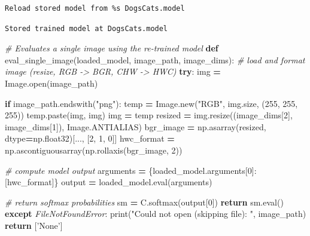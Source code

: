 \documentclass[]{book}
\newenvironment{Shaded}{\begin{snugshade}}{\end{snugshade}}
\newcommand{\KeywordTok}[1]{\textcolor[rgb]{0.13,0.29,0.53}{\textbf{#1}}}
\newcommand{\DecValTok}[1]{\textcolor[rgb]{0.00,0.00,0.81}{#1}}
\newcommand{\SpecialCharTok}[1]{\textcolor[rgb]{0.00,0.00,0.00}{#1}}
\newcommand{\StringTok}[1]{\textcolor[rgb]{0.31,0.60,0.02}{#1}}
\newcommand{\CommentTok}[1]{\textcolor[rgb]{0.56,0.35,0.01}{\textit{#1}}}
\newcommand{\ControlFlowTok}[1]{\textcolor[rgb]{0.13,0.29,0.53}{\textbf{#1}}}
\newcommand{\OperatorTok}[1]{\textcolor[rgb]{0.81,0.36,0.00}{\textbf{#1}}}
\newcommand{\BuiltInTok}[1]{#1}
\newcommand{\PreprocessorTok}[1]{\textcolor[rgb]{0.56,0.35,0.01}{\textit{#1}}}
\newcommand{\NormalTok}[1]{#1}
\theoremstyle{definition}
\theoremstyle{definition}
\theoremstyle{definition}
\theoremstyle{remark}
\begin{document}
\begin{verbatim}
Reload stored model from %s DogsCats.model
\end{verbatim}

\begin{Shaded}
\end{Shaded}

\begin{verbatim}
Stored trained model at DogsCats.model
\end{verbatim}

\begin{Shaded}
\begin{Highlighting}[]
\CommentTok{# Evaluates a single image using the re-trained model}
\KeywordTok{def}\NormalTok{ eval_single_image(loaded_model, image_path, image_dims):}
    \CommentTok{# load and format image (resize, RGB -> BGR, CHW -> HWC)}
    \ControlFlowTok{try}\NormalTok{:}
\NormalTok{        img }\OperatorTok{=}\NormalTok{ Image.}\BuiltInTok{open}\NormalTok{(image_path)}

        \ControlFlowTok{if}\NormalTok{ image_path.endswith(}\StringTok{"png"}\NormalTok{):}
\NormalTok{            temp }\OperatorTok{=}\NormalTok{ Image.new(}\StringTok{"RGB"}\NormalTok{, img.size, (}\DecValTok{255}\NormalTok{, }\DecValTok{255}\NormalTok{, }\DecValTok{255}\NormalTok{))}
\NormalTok{            temp.paste(img, img)}
\NormalTok{            img }\OperatorTok{=}\NormalTok{ temp}
\NormalTok{        resized }\OperatorTok{=}\NormalTok{ img.resize((image_dims[}\DecValTok{2}\NormalTok{], image_dims[}\DecValTok{1}\NormalTok{]), Image.ANTIALIAS)}
\NormalTok{        bgr_image }\OperatorTok{=}\NormalTok{ np.asarray(resized, dtype}\OperatorTok{=}\NormalTok{np.float32)[..., [}\DecValTok{2}\NormalTok{, }\DecValTok{1}\NormalTok{, }\DecValTok{0}\NormalTok{]]}
\NormalTok{        hwc_format }\OperatorTok{=}\NormalTok{ np.ascontiguousarray(np.rollaxis(bgr_image, }\DecValTok{2}\NormalTok{))}

        \CommentTok{# compute model output}
\NormalTok{        arguments }\OperatorTok{=}\NormalTok{ \{loaded_model.arguments[}\DecValTok{0}\NormalTok{]: [hwc_format]\}}
\NormalTok{        output }\OperatorTok{=}\NormalTok{ loaded_model.}\BuiltInTok{eval}\NormalTok{(arguments)}

        \CommentTok{# return softmax probabilities}
\NormalTok{        sm }\OperatorTok{=}\NormalTok{ C.softmax(output[}\DecValTok{0}\NormalTok{])}
        \ControlFlowTok{return}\NormalTok{ sm.}\BuiltInTok{eval}\NormalTok{()}
    \ControlFlowTok{except} \PreprocessorTok{FileNotFoundError}\NormalTok{:}
        \BuiltInTok{print}\NormalTok{(}\StringTok{"Could not open (skipping file): "}\NormalTok{, image_path)}
        \ControlFlowTok{return}\NormalTok{ [}\StringTok{'None'}\NormalTok{]}
\end{Highlighting}
\end{Shaded}
\end{document}
